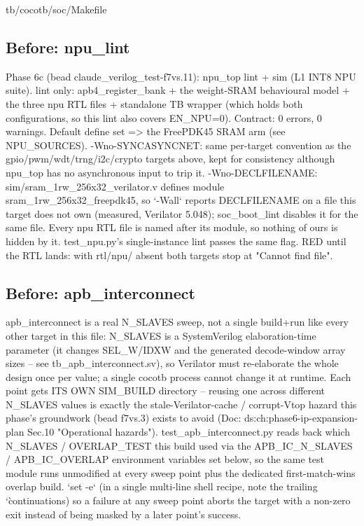 \begin{relocated}{tb/cocotb/soc/Makefile}
\subsection*{Before: npu\_lint}

\begin{textblock}
Phase 6c (bead claude_verilog_test-f7vs.11): npu_top lint + sim (L1 INT8 NPU suite).
lint only: apb4_register_bank + the weight-SRAM behavioural model + the three npu RTL files +
standalone TB wrapper (which holds both configurations, so this lint also covers EN_NPU=0).
Contract: 0 errors, 0 warnings.  Default define set => the FreePDK45 SRAM arm (see NPU_SOURCES).
-Wno-SYNCASYNCNET: same per-target convention as the gpio/pwm/wdt/trng/i2c/crypto targets above,
kept for consistency although npu_top has no asynchronous input to trip it.
-Wno-DECLFILENAME: sim/sram_1rw_256x32_verilator.v defines module sram_1rw_256x32_freepdk45, so
`-Wall` reports DECLFILENAME on a file this target does not own (measured, Verilator 5.048);
soc_boot_lint disables it for the same file. Every npu RTL file is named after its module, so
nothing of ours is hidden by it. test_npu.py's single-instance lint passes the same flag.
RED until the RTL lands: with rtl/npu/ absent both targets stop at "Cannot find file".
\end{textblock}

\subsection*{Before: apb\_interconnect}

\begin{textblock}
apb_interconnect is a real N_SLAVES sweep, not a single build+run like every other target in
this file: N_SLAVES is a SystemVerilog elaboration-time parameter (it changes SEL_W/IDXW and
the generated decode-window array sizes -- see tb_apb_interconnect.sv), so Verilator must
re-elaborate the whole design once per value; a single cocotb process cannot change it at
runtime. Each point gets ITS OWN SIM_BUILD directory -- reusing one across different N_SLAVES
values is exactly the stale-Verilator-cache / corrupt-Vtop hazard this phase's groundwork
(bead f7vs.3) exists to avoid (Doc: ds:ch:phase6-ip-expansion-plan Sec.10 "Operational hazards").
test_apb_interconnect.py reads back which N_SLAVES / OVERLAP_TEST this build used via the
APB_IC_N_SLAVES / APB_IC_OVERLAP environment variables set below, so the same test module
runs unmodified at every sweep point plus the dedicated first-match-wins overlap build.
`set -e` (in a single multi-line shell recipe, note the trailing `\` continuations) so a
failure at any sweep point aborts the target with a non-zero exit instead of being masked by
a later point's success.
\end{textblock}


\end{relocated}

